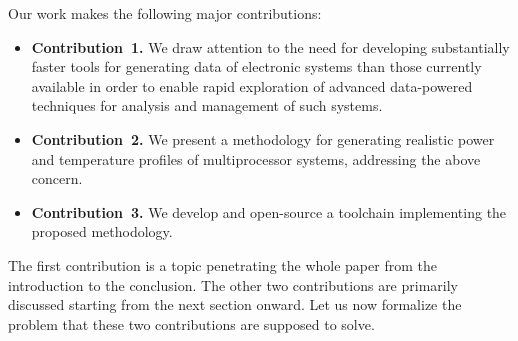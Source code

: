 Our work makes the following major contributions:

\begin{itemize}
  \item {\bfseries Contribution~1.} We draw attention to the need for developing
  substantially faster tools for generating data of electronic systems than
  those currently available in order to enable rapid exploration of advanced
  data-powered techniques for analysis and management of such systems.

  \item {\bfseries Contribution~2.} We present a methodology for generating
  realistic power and temperature profiles of multiprocessor systems,
  addressing the above concern.

  \item {\bfseries Contribution~3.} We develop and open-source a toolchain
  implementing the proposed methodology.
\end{itemize}

The first contribution is a topic penetrating the whole paper from the
introduction to the conclusion. The other two contributions are primarily
discussed starting from the next section onward. Let us now formalize the
problem that these two contributions are supposed to solve.
